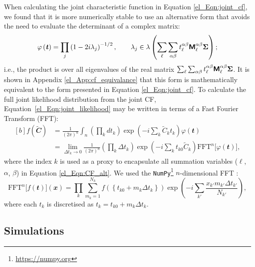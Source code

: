 When calculating the joint characteristic function in Equation \eqref{el_Eqn:joint_cf}, we found that it is more numerically stable to use an alternative form that avoids the need to evaluate the determinant of a complex matrix:
\begin{equation}
    \varphi \left( \bm{\mathit{t}} \right) =
    \prod_j \left(
    1 - 2i \lambda_j
    \right)^{-1/2},
    \quad \quad
    \lambda_j \in
    \lambda \left( \sum_\ell \sum_{\alpha \beta}
    t_\ell^{\alpha \beta} \bm{\mathsf{M}}_\ell^{\alpha \beta} \bm{\Sigma}
    \right);
    \label{el_Eqn:CF_alt}
\end{equation}
i.e., the product is over all eigenvalues of the real matrix
$\sum_\ell \sum_{\alpha \beta}
t_\ell^{\alpha \beta} \bm{\mathsf{M}}_\ell^{\alpha \beta} \bm{\Sigma}$. It is shown in
Appendix \ref{el_App:cf_equivalance}
that this form is mathematically equivalent to the form presented in Equation \eqref{el_Eqn:joint_cf}. To calculate the full joint likelihood distribution from the joint CF, Equation~\eqref{el_Eqn:joint_likelihood} may be written in terms of a Fast Fourier Transform (FFT):
\begin{equation}
\begin{aligned}[b]
f \left( \widetilde{\mathbfit{C}} \right) &=
\frac{1}{\left( 2 \pi \right)^n}
\int_n \left( \prod_k dt_k \right)
\exp \left( -i \sum_k
\widetilde{C}_k t_k \right)
\varphi \left( \mathbfit{t} \right) \\
&= \lim_{\Delta t_k \to 0}
\frac{1}{\left( 2 \pi \right)^n}
\left( \prod_k \Delta t_k \right)
\exp \left( -i \sum_k t_{k0} \widetilde{C}_k \right)
\mathrm{FFT}^n \big[ \varphi \left( \mathbfit{t} \right) \big],
\end{aligned}
\end{equation}
where the index $k$ is used as a proxy to encapsulate all summation variables ($\ell$, $\alpha$, $\beta$) in Equation \eqref{el_Eqn:CF_alt}. We used the \texttt{NumPy}\footnote{\url{https://numpy.org}} $n$-dimensional FFT \citep{Harris2020}:
\begin{equation}
\mathrm{FFT}^n \big[ f \left( \mathbfit{t} \right) \big] \left( \mathbfit{x} \right) =
\prod_k \sum_{m_k = 1}^{N_k}
f \left( \left\{ t_{k0} + m_k \Delta t_k \right\} \right)
\exp \left( -i \sum_{k'} \frac{ x_{k'} m_{k'} \Delta t_{k'} }{N_{k'}} \right),
\end{equation}
where each $t_k$ is discretised as $t_k = t_{k0} + m_k \Delta t_k$.

\subsection{Simulations}

